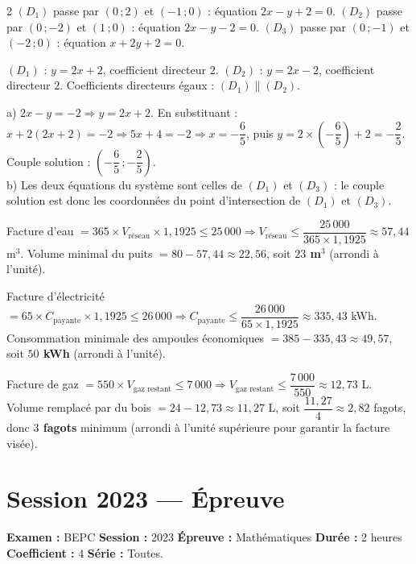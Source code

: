 \begin{multicols}{2}
$(D_1)$ passe par $(0\,;2)$ et $(-1\,;0)$ : équation $2x-y+2=0$. $(D_2)$ passe par
$(0\,;-2)$ et $(1\,;0)$ : équation $2x-y-2=0$. $(D_3)$ passe par $(0\,;-1)$ et $(-2\,;0)$ :
équation $x+2y+2=0$.

$(D_1)$ : $y=2x+2$, coefficient directeur $2$. $(D_2)$ : $y=2x-2$, coefficient directeur
$2$. Coefficients directeurs égaux : $(D_1)\parallel(D_2)$.

a) $2x-y=-2\Rightarrow y=2x+2$. En substituant : $x+2(2x+2)=-2\Rightarrow5x+4=-2\Rightarrow x=-\dfrac65$,
puis $y=2\times\left(-\dfrac65\right)+2=-\dfrac25$. Couple solution : $\left(-\dfrac65\,;-\dfrac25\right)$. \\
b) Les deux équations du système sont celles de $(D_1)$ et $(D_3)$ : le couple solution est
donc les coordonnées du point d'intersection de $(D_1)$ et $(D_3)$.

Facture d'eau $=365\times V_{\text{réseau}}\times1{,}1925\le25\,000\Rightarrow
V_{\text{réseau}}\le\dfrac{25\,000}{365\times1{,}1925}\approx57{,}44$ m$^{3}$.
Volume minimal du puits $=80-57{,}44\approx22{,}56$, soit \textbf{$23$ m$^{3}$} (arrondi à
l'unité).

Facture d'électricité $=65\times C_{\text{payante}}\times1{,}1925\le26\,000\Rightarrow
C_{\text{payante}}\le\dfrac{26\,000}{65\times1{,}1925}\approx335{,}43$ kWh. Consommation
minimale des ampoules économiques $=385-335{,}43\approx49{,}57$, soit \textbf{$50$ kWh}
(arrondi à l'unité).

Facture de gaz $=550\times V_{\text{gaz restant}}\le7\,000\Rightarrow
V_{\text{gaz restant}}\le\dfrac{7\,000}{550}\approx12{,}73$ L. Volume remplacé par du bois
$=24-12{,}73\approx11{,}27$ L, soit $\dfrac{11{,}27}{4}\approx2{,}82$ fagots, donc
\textbf{$3$ fagots} minimum (arrondi à l'unité supérieure pour garantir la facture visée).

\end{multicols}

\section{Session 2023 — Épreuve}

\noindent\textbf{Examen :} BEPC \quad\textbf{Session :} 2023 \quad\textbf{Épreuve :}
Mathématiques \quad\textbf{Durée :} 2 heures \quad\textbf{Coefficient :} 4 \quad
\textbf{Série :} Toutes.


